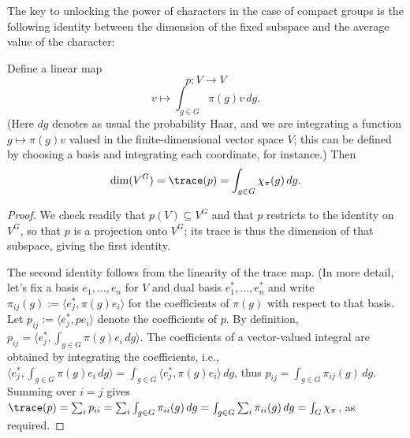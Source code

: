 \documentclass[reqno]{amsart} 
\begin{document}
The key to unlocking the power of characters in the case of compact groups is the following identity between the dimension of the fixed subspace and the average value of the character:
\begin{lemma}
  Define a linear map
  \begin{equation*}
    p : V \rightarrow V
  \end{equation*}
  \begin{equation*}
    v \mapsto \int_{g \in G} \pi(g) v \, d g.
  \end{equation*}
  (Here $d g$ denotes as usual the probability Haar, and we are integrating a function $g \mapsto \pi(g) v$ valued in the finite-dimensional vector space $V$; this can be defined by choosing a basis and integrating each coordinate, for instance.)  Then
  \begin{equation}\label{eq:}
    \dim(V^G) = \trace(p)
    = \int_{g \in G} \chi_\pi(g) \, d g.
  \end{equation}
\end{lemma}
\begin{proof}
  We check readily that $p(V) \subseteq V^G$ and that $p$ restricts to the identity on $V^G$, so that $p$ is a projection onto $V^G$; its trace is thus the dimension of that subspace, giving the first identity.

  The second identity follows from the linearity of the trace map.  (In more detail, let's fix a basis $e_1,\dotsc,e_n$ for $V$ and dual basis $e_1^*,\dotsc,e_n^*$ and write $\pi_{ij}(g) := \langle e_j^*, \pi(g) e_i \rangle$ for the coefficients of $\pi(g)$ with respect to that basis.  Let $p_{ij} := \langle e_j^*, p e_i \rangle$ denote the coefficients of $p$.  By definition, $p_{i j} = \langle e_j^*, \int_{g \in G} \pi(g) e_i \, d g \rangle$.  The coefficients of a vector-valued integral are obtained by integrating the coefficients, i.e., $\langle e_j^*, \int_{g \in G} \pi(g) e_i \, d g \rangle = \int_{g \in G} \langle e_j^*, \pi(g) e_i \rangle \, d g$, thus $p_{i j} = \int_{g \in G} \pi_{i j}(g) \, d g$.  Summing over $i = j$ gives $\trace(p) = \sum_i p_{i i} = \sum_{i} \int_{g \in G} \pi_{i i}(g) \, d g =\int_{g \in G} \sum_{i} \pi_{i i}(g) \, d g = \int_{G} \chi_\pi$, as required.
\end{proof}
\end{document}
